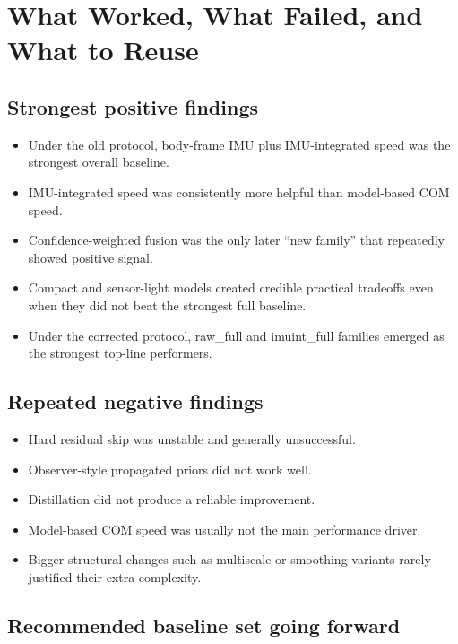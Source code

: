 \documentclass[11pt,a4paper]{article}
\begin{document}
\section{What Worked, What Failed, and What to Reuse}

\subsection{Strongest positive findings}

\begin{itemize}
\item Under the old protocol, body-frame IMU plus IMU-integrated speed was the strongest overall baseline.
\item IMU-integrated speed was consistently more helpful than model-based COM speed.
\item Confidence-weighted fusion was the only later ``new family'' that repeatedly showed positive signal.
\item Compact and sensor-light models created credible practical tradeoffs even when they did not beat the strongest full baseline.
\item Under the corrected protocol, raw\_full and imuint\_full families emerged as the strongest top-line performers.
\end{itemize}

\subsection{Repeated negative findings}

\begin{itemize}
\item Hard residual skip was unstable and generally unsuccessful.
\item Observer-style propagated priors did not work well.
\item Distillation did not produce a reliable improvement.
\item Model-based COM speed was usually not the main performance driver.
\item Bigger structural changes such as multiscale or smoothing variants rarely justified their extra complexity.
\end{itemize}

\subsection{Recommended baseline set going forward}
\end{document}
